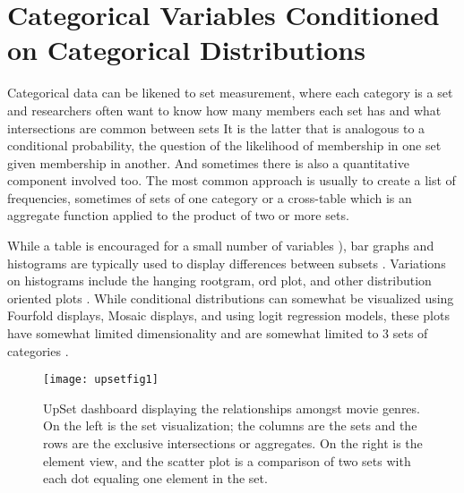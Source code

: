 \documentclass[../main.tex]{subfiles}
\begin{document}
\section{Categorical Variables Conditioned on Categorical Distributions}

Categorical data can be likened to set measurement, where each category is a set
and researchers often want to know how many members each set has and what
intersections are common between sets \cite{agresti_categorical_2011,schneider_set-theoretic_2012}
  It is the latter that is analogous to a
conditional probability, the question of the likelihood of membership in one
set given membership in another. And sometimes there is also a quantitative
component involved too. The most common approach is usually to create a list of frequencies, sometimes of sets of one category or a cross-table\cite{goodman_measures_1991} which is an aggregate function applied to the product of two or more sets.

 While a table is encouraged for a small number of variables
 \cite{munzner_what:_2014}), bar graphs and histograms are typically used to display differences between subsets \cite{ioannidis_history_2003-1, friendly_brief_2006}. Variations on histograms
 include the hanging rootgram, ord plot, and other distribution oriented
 plots \cite{tukey_exploratory_1977, friendly_visualizing_2000}. While conditional  distributions can somewhat be visualized using Fourfold displays, Mosaic displays, and using logit regression models, these plots have somewhat limited dimensionality and are somewhat limited to 3 sets of categories
 \cite{friendly_visualizing_2000}. 
   
 
\begin{figure}
  \texttt{[image: upsetfig1]}
   \caption{UpSet dashboard displaying the relationships amongst movie genres. On the left is the set visualization; the columns are the sets and
   the rows are the exclusive intersections or aggregates. On the right is the element view, and the scatter plot is a comparison of two sets with each dot equaling one element in the set.}
   \label{fig:upsetfig}
\end{figure}
\end{document}
